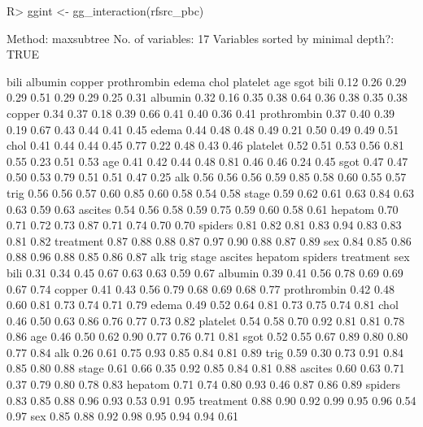 \documentclass[article, nojss]{jss}
\begin{document}
\begin{Schunk}
\begin{Sinput}
R> ggint <- gg_interaction(rfsrc_pbc)
\end{Sinput}
\begin{Soutput}

                              Method: maxsubtree
                    No. of variables: 17
  Variables sorted by minimal depth?: TRUE

            bili albumin copper prothrombin edema chol platelet  age sgot
bili        0.12    0.26   0.29        0.29  0.51 0.29     0.29 0.25 0.31
albumin     0.32    0.16   0.35        0.38  0.64 0.36     0.38 0.35 0.38
copper      0.34    0.37   0.18        0.39  0.66 0.41     0.40 0.36 0.41
prothrombin 0.37    0.40   0.39        0.19  0.67 0.43     0.44 0.41 0.45
edema       0.44    0.48   0.48        0.49  0.21 0.50     0.49 0.49 0.51
chol        0.41    0.44   0.44        0.45  0.77 0.22     0.48 0.43 0.46
platelet    0.52    0.51   0.53        0.56  0.81 0.55     0.23 0.51 0.53
age         0.41    0.42   0.44        0.48  0.81 0.46     0.46 0.24 0.45
sgot        0.47    0.47   0.50        0.53  0.79 0.51     0.51 0.47 0.25
alk         0.56    0.56   0.56        0.59  0.85 0.58     0.60 0.55 0.57
trig        0.56    0.56   0.57        0.60  0.85 0.60     0.58 0.54 0.58
stage       0.59    0.62   0.61        0.63  0.84 0.63     0.63 0.59 0.63
ascites     0.54    0.56   0.58        0.59  0.75 0.59     0.60 0.58 0.61
hepatom     0.70    0.71   0.72        0.73  0.87 0.71     0.74 0.70 0.70
spiders     0.81    0.82   0.81        0.83  0.94 0.83     0.83 0.81 0.82
treatment   0.87    0.88   0.88        0.87  0.97 0.90     0.88 0.87 0.89
sex         0.84    0.85   0.86        0.88  0.96 0.88     0.85 0.86 0.87
             alk trig stage ascites hepatom spiders treatment  sex
bili        0.31 0.34  0.45    0.67    0.63    0.63      0.59 0.67
albumin     0.39 0.41  0.56    0.78    0.69    0.69      0.67 0.74
copper      0.41 0.43  0.56    0.79    0.68    0.69      0.68 0.77
prothrombin 0.42 0.48  0.60    0.81    0.73    0.74      0.71 0.79
edema       0.49 0.52  0.64    0.81    0.73    0.75      0.74 0.81
chol        0.46 0.50  0.63    0.86    0.76    0.77      0.73 0.82
platelet    0.54 0.58  0.70    0.92    0.81    0.81      0.78 0.86
age         0.46 0.50  0.62    0.90    0.77    0.76      0.71 0.81
sgot        0.52 0.55  0.67    0.89    0.80    0.80      0.77 0.84
alk         0.26 0.61  0.75    0.93    0.85    0.84      0.81 0.89
trig        0.59 0.30  0.73    0.91    0.84    0.85      0.80 0.88
stage       0.61 0.66  0.35    0.92    0.85    0.84      0.81 0.88
ascites     0.60 0.63  0.71    0.37    0.79    0.80      0.78 0.83
hepatom     0.71 0.74  0.80    0.93    0.46    0.87      0.86 0.89
spiders     0.83 0.85  0.88    0.96    0.93    0.53      0.91 0.95
treatment   0.88 0.90  0.92    0.99    0.95    0.96      0.54 0.97
sex         0.85 0.88  0.92    0.98    0.95    0.94      0.94 0.61
\end{Soutput}
\end{Schunk}
\end{document}
